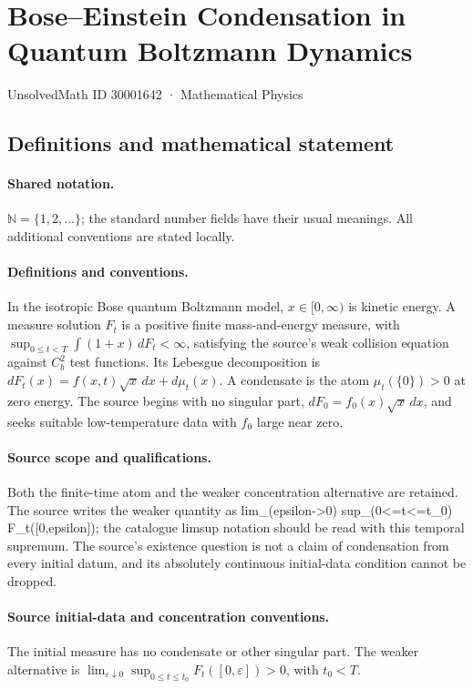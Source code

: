 \documentclass[11pt]{article}
\begin{document}
\setcounter{section}{30001641}
\section{Bose–Einstein Condensation in Quantum Boltzmann Dynamics}\label{30001642}
{\small UnsolvedMath ID 30001642 · Mathematical Physics}
\subsection{Definitions and mathematical statement}

\paragraph{Shared notation.}$\mathbb N=\{1,2,\ldots\}$; the standard number fields have their usual meanings. All additional conventions are stated locally.


\paragraph{Definitions and conventions.} In the isotropic Bose quantum Boltzmann model, $x\in[0,\infty)$ is kinetic energy. A measure solution $F_t$ is a positive finite mass-and-energy measure, with $\sup_{0\le t<T}\int(1+x)\,dF_t<\infty$, satisfying the source's weak collision equation against $C_b^2$ test functions. Its Lebesgue decomposition is $dF_t(x)=f(x,t)\sqrt{x}\,dx+d\mu_t(x)$. A condensate is the atom $\mu_t(\{0\})>0$ at zero energy. The source begins with no singular part, $dF_0=f_0(x)\sqrt{x}\,dx$, and seeks suitable low-temperature data with $f_0$ large near zero.

\paragraph{Source scope and qualifications.} Both the finite-time atom and the weaker concentration alternative are retained. The source writes the weaker quantity as lim\_(epsilon->0) sup\_(0<=t<=t\_0) F\_t([0,epsilon]); the catalogue limsup notation should be read with this temporal supremum. The source's existence question is not a claim of condensation from every initial datum, and its absolutely continuous initial-data condition cannot be dropped.

\paragraph{Source initial-data and concentration conventions.} The initial measure has no condensate or other singular part. The weaker alternative is $\lim_{\varepsilon\downarrow0}\sup_{0\le t\le t_0}F_t([0,\varepsilon])>0$, with $t_0<T$.
\end{document}
